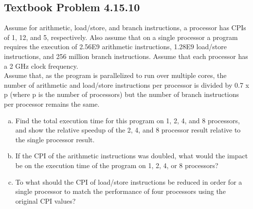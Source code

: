 \documentclass[12pt]{article}
\begin{document}
\subsection{Textbook Problem 4.15.10}
Assume for arithmetic, load/store, and branch instructions, a processor has CPIs of 1, 12, and 5, respectively. Also assume that on a single processor a program requires the execution of 2.56E9 arithmetic instructions, 1.28E9 load/store instructions, and 256 million branch instructions. Assume that each processor has a 2 GHz clock frequency.
\\
Assume that, as the program is parallelized to run over multiple cores, the number of arithmetic and load/store instructions per processor is divided by 0.7 x p (where p is the number of processors) but the number of branch instructions per processor remains the same.
\begin{enumerate}[(a)]
    \item Find the total execution time for this program on 1, 2, 4, and 8 processors, and show the relative speedup of the 2, 4, and 8 processor result relative to the single processor result.
    \item If the CPI of the arithmetic instructions was doubled, what would the impact be on the execution time of the program on 1, 2, 4, or 8 processors?
    \item To what should the CPI of load/store instructions be reduced in order for a single processor to match the performance of four processors using the original CPI values?

\end{enumerate}


\end{document}
